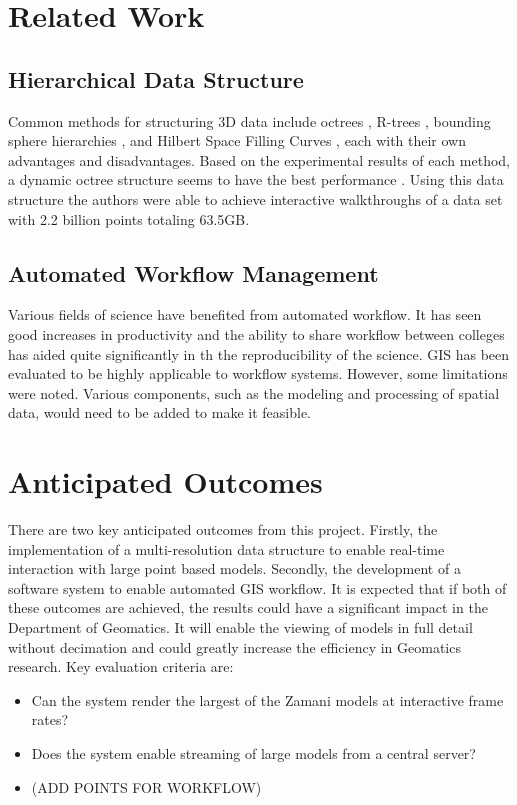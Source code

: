 \documentclass[12pt,a4paper]{article}
\begin{document}
\section{Related Work}
\subsection{Hierarchical Data Structure}
Common methods for structuring 3D data include octrees \cite{interactivepointclouds},
R-trees \cite{rtree}, bounding sphere hierarchies \cite{qsplat}, and Hilbert Space
Filling Curves \cite{hilbert}, each with their own advantages and disadvantages. Based
on the experimental results of each method, a dynamic octree structure seems to have
the best performance \cite{interactivepointclouds}. Using this data structure the
authors were able to achieve interactive walkthroughs of a data set with 2.2
billion points totaling 63.5GB.

\subsection{Automated Workflow Management}
Various fields of science have benefited from automated workflow. It has
seen good increases in productivity \cite{Brahe:2007:SWW:1316624.1316661} and the ability to share
workflow between colleges has aided quite significantly in th the reproducibility
of the science\cite{4721191}. GIS has been evaluated to be highly applicable to
workflow systems\cite{migliorini2011workflow}. However, some limitations were noted. Various components, such as the modeling and processing of spatial data,
would need to be added to make it feasible.

\section{Anticipated Outcomes}
There are two key anticipated outcomes from this project. Firstly, the implementation of a multi-resolution data structure to enable real-time interaction with large point based models. Secondly, the development of a software system to enable automated GIS workflow. It is expected that if both of these outcomes are achieved, the results could have a significant impact in the Department of Geomatics. It will enable the viewing of models in full detail without decimation and could greatly increase the efficiency in Geomatics research. Key evaluation criteria are:
\begin{itemize}
\item Can the system render the largest of the Zamani models at interactive frame rates?
\item Does the system enable streaming of large models from a central server?
\item (ADD POINTS FOR WORKFLOW)
\end{itemize}
\end{document}
